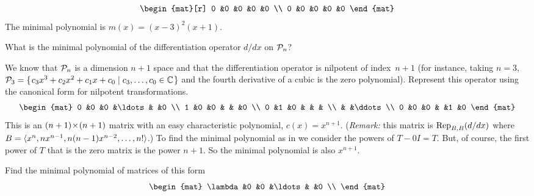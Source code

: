 \begin{exercises}
\begin{answer}
\begin{exparts}
\begin{multline*}
\begin{aligned}
\begin{mat}[r]
               0   &0    &0    &0    &0    \\
               0   &0    &0    &0    &0  
           \end{mat}  
           \end{aligned}         
         \end{multline*}
         The minimal polynomial is \( m(x)=(x-3)^2(x+1) \).
      \end{exparts} 
    \end{answer}
  \recommended \item 
     What is the minimal polynomial of the differentiation
     operator $d/dx$ on \( \polyspace_n \)?
     \begin{answer}
       We know that $\polyspace_n$ is a dimension $n+1$ space and that
       the differentiation operator is
       nilpotent of index~$n+1$ (for instance, taking $n=3$, 
       $\polyspace_3=\set{c_3x^3+c_2x^2+c_1x+c_0\suchthat c_3,\ldots,c_0\in\C}$
       and the fourth derivative of a cubic is the zero polynomial).  
       Represent this operator using the canonical 
       form for nilpotent transformations.
       \begin{equation*}
         \begin{mat}
           0  &0  &0  &\ldots &  &0  \\
           1  &0  &0  &       &  &0  \\
           0  &1  &0  &       &  &   \\
              &   &\ddots            \\
           0  &0  &0  &       &1 &0 
         \end{mat}
       \end{equation*}
       This is an $\nbyn{(n+1)}$ matrix with an easy 
       characteristic polynomial,
       $c(x)=x^{n+1}$.
       (\textit{Remark:} this matrix is $\rep{d/dx}{B,B}$ where
        $B=\sequence{x^n,nx^{n-1},n(n-1)x^{n-2},\ldots,n!}$.)
       To find the minimal polynomial as in 
       we consider the powers of $T-0I=T$.
       But, of course, the first power of $T$ that is the zero matrix is 
       the power $n+1$.
       So the minimal polynomial is also \( x^{n+1} \).
     \end{answer}
  \recommended \item 
    Find the minimal polynomial of matrices of this form
    \begin{equation*}
      \begin{mat}
        \lambda  &0        &0          &\ldots  &        &0  \\

\end{mat}
\end{equation*}
\end{exercises}
